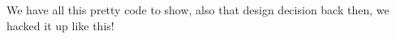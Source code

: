 We have all this pretty code to show, also that design decision back then, we hacked it up like this!
